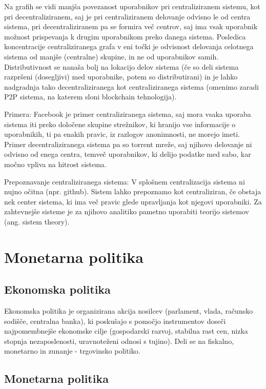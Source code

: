 \documentclass[letterpaper, titlepage, freqn]{article}
\begin{document}
Na grafih se vidi manjša povezanost uporabnikov pri centraliziranem sistemu, kot pri decentraliziranem, saj je pri centraliziranem delovanje odvisno le od centra sistema, pri decentraliziranem pa se formira več centrov, saj ima vsak uporabnik možnost prispevanja k drugim uporabnikom preko danega sistema.
Posledica koncentracije centraliziranega grafa v eni točki je odvisnost delovanja celotnega sistema od manjše (centralne) skupine, in ne od uporabnikov samih. 
Distributivnost se nanaša bolj na lokacijo delov sistema (če so deli sistema razpršeni (dosegljivi) med uporabnike, potem so distributirani) in je lahko nadgradnja tako decentraliziranega kot centraliziranega sistema (omenimo zaradi P2P sistema, na katerem sloni blockchain tehnologija).

Primera: Facebook je primer centraliziranega sistema, saj mora vsaka uporaba sistema iti preko določene skupine strežnikov, ki hranijo vse informacije o uporabnikih, ti pa enakih pravic, iz razlogov anonimnosti, ne morejo imeti.
Primer decentraliziranega sistema pa so torrent mreže, saj njihovo delovanje ni odvisno od enega centra, temveč uporabnikov, ki delijo podatke med sabo, kar močno vpliva na hitrost sistema.

Prepoznavanje centraliziranega sistema: V splošnem centralizacija sistema ni nujno očitna (npr. github). Sistem lahko prepoznamo kot centraliziran, če obstaja nek center sistema, ki ima več pravic glede upravljanja kot njegovi uporabniki.
Za zahtevnejše sisteme je za njihovo analitiko pametno uporabiti teorijo sistemov (ang. sistem theory).\\


\section{Monetarna politika}

\subsection{Ekonomska politika}

Ekonomska politika je organizirana akcija nosilcev (parlament, vlada, računsko sodišče, centralna banka), ki poskušajo s pomočjo instrumentov doseči najpomembnejše ekonomske cilje (gospodarski razvoj, stabilna rast cen, nizka stopnja nezaposlenosti, uravnoteženi odnosi s tujino). Deli se na fiskalno, monetarno in zunanje - trgovinsko politiko.\\

\subsection{Monetarna politika}
\end{document}
